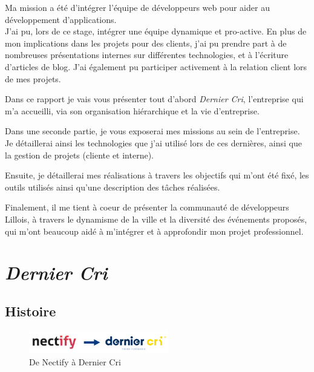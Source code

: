 \documentclass[12pt,a4paper]{article}
\begin{document}
  \bigskip

  Ma mission a été d'intégrer l'équipe de développeurs web pour aider au
  développement d'applications.\\
  J'ai pu, lors de ce stage, intégrer une équipe dynamique et pro-active.
  En plus de mon implications dans les projets pour des clients, j'ai pu
  prendre part à de nombreuses présentations internes sur différentes
  technologies, et à l'écriture d'articles de blog. J'ai également pu
  participer activement à la relation client lors de mes projets.

  \bigskip

  Dans ce rapport je vais vous présenter tout d'abord \emph{Dernier Cri},
  l'entreprise qui m'a accueilli, via son organisation hiérarchique et la
  vie d'entreprise.

  \bigskip

  Dans une seconde partie, je vous exposerai mes missions au sein de
  l'entreprise. Je détaillerai ainsi les technologies que j'ai utilisé
  lors de ces dernières, ainsi que la gestion de projets (cliente et
  interne).

  \bigskip

  Ensuite, je détaillerai mes réalisations à travers les objectifs qui
  m'ont été fixé, les outils utilisés ainsi qu'une description des tâches
  réalisées.

  \bigskip

  Finalement, il me tient à coeur de présenter la communauté de
  développeurs Lillois, à travers le dynamisme de la ville et la diversité
  des événements proposés, qui m'ont beaucoup aidé à m'intégrer et à
  approfondir mon projet professionnel.

  \newpage

  \section{\texorpdfstring{\emph{Dernier
  Cri}}{Dernier Cri}}\label{dernier-cri}

  \bigskip

  \subsection{Histoire}\label{histoire}

  \begin{figure}[h]
    \centering
    \includegraphics[height=1cm]{figures/NectifyToDC.png}
    \caption{De Nectify à Dernier Cri}
  \end{figure}
\end{document}
